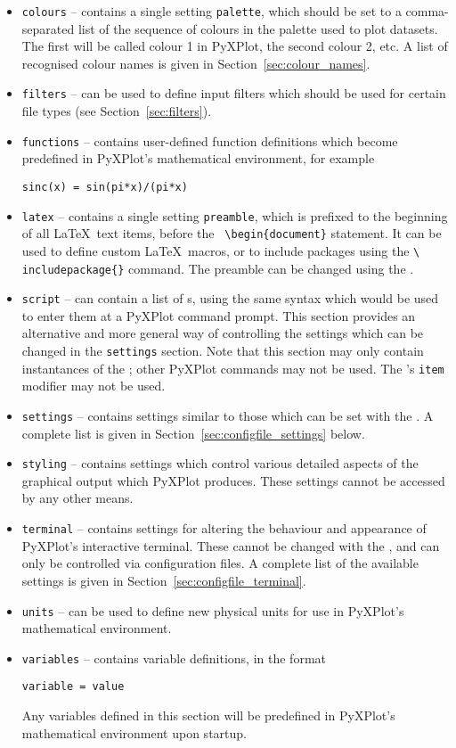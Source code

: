 \begin{itemize}
\item {\tt colours} -- contains a single setting {\tt palette}, which should be
set to a comma-separated list of the sequence of colours in the palette used to
plot datasets. The first will be called colour 1 in PyXPlot, the second colour
2, etc. A list of recognised colour names is given in
Section~\ref{sec:colour_names}.
\item {\tt filters} -- can be used to define input filters which should be used
for certain file types (see Section~\ref{sec:filters}).
\item {\tt functions} -- contains user-defined function definitions which
become predefined in PyXPlot's mathematical environment, for example
\begin{verbatim}
sinc(x) = sin(pi*x)/(pi*x)
\end{verbatim}
\item {\tt latex} -- contains a single setting {\tt preamble}, which is
prefixed to the beginning of all \LaTeX\ text items, before the {\tt
\textbackslash begin\{document\}} statement. It can be used to define custom
\LaTeX\ macros, or to include packages using the {\tt \textbackslash
includepackage\{\}} command.  The preamble can be changed using the
.
\item {\tt script} -- can contain a list of s, using the same
syntax which would be used to enter them at a PyXPlot command prompt. This
section provides an alternative and more general way of controlling the
settings which can be changed in the {\tt settings} section. Note that this
section may only contain instantances of the ; other PyXPlot
commands may not be used. The 's {\tt item} modifier may not be
used.
\item {\tt settings} -- contains settings similar to those which can be set
with the . A complete list is given in
Section~\ref{sec:configfile_settings} below.
\item {\tt styling} -- contains settings which control various detailed aspects
of the graphical output which PyXPlot produces. These settings cannot be
accessed by any other means.
\item {\tt terminal} -- contains settings for altering the behaviour and
appearance of PyXPlot's interactive terminal. These cannot be changed with the
, and can only be controlled via configuration files. A complete
list of the available settings is given in
Section~\ref{sec:configfile_terminal}.
\item {\tt units} -- can be used to define new physical units for use in
PyXPlot's mathematical environment.
\item {\tt variables} -- contains variable definitions, in the format
\begin{verbatim}
variable = value
\end{verbatim}
Any variables defined in this section will be predefined in PyXPlot's
mathematical environment upon startup.

\end{itemize}

